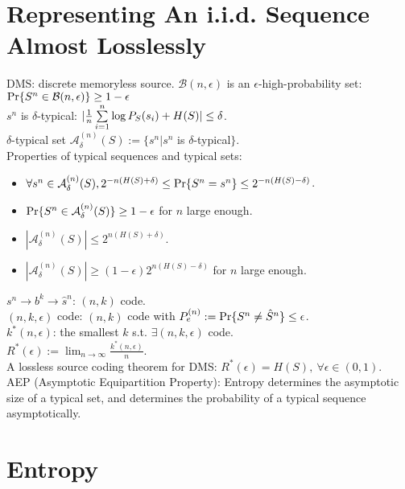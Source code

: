 \section{Representing An i.i.d. Sequence Almost Losslessly}

DMS: discrete memoryless source.
$\mathcal{B}(n, \epsilon)$ is an $\epsilon$-high-probability set: $\P\{S^n\in\mathcal{B}(n, \epsilon)\}\geq1-\epsilon$\\
$s^n$ is $\delta$-typical: $|\frac1n\suml_{i=1}^n\log P_S(s_i)+H(S)|\leq\delta$.\\
$\delta$-typical set $\mathcal{A}_\delta^{(n)}(S):=\{s^n|s^n$ is $\delta$-typical$\}$.\\
Properties of typical sequences and typical sets:
\begin{itemize}
\item $\forall s^n\in\mathcal{A}^{(n)}_\delta(S), 2^{-n(H(S)+\delta)}\leq\P\{S^n=s^n\}\leq2^{-n(H(S)-\delta)}$.
\item $\P\{S^n\in\mathcal{A}^{(n)}_\delta(S)\}\geq1-\epsilon$ for $n$ large enough.
\item $|\mathcal{A}^{(n)}_\delta(S)|\leq2^{n(H(S)+\delta)}$.
\item $|\mathcal{A}^{(n)}_\delta(S)|\geq(1-\epsilon)2^{n(H(S)-\delta)}$ for $n$ large enough.
\end{itemize}
$s^n\to b^k\to\hat s^n$: $(n, k)$ code.\\
$(n, k, \epsilon)$ code: $(n, k)$ code with $P^{(n)}_e:=\P\{S^n\neq\hat S^n\}\leq\epsilon$.\\
$k^*(n, \epsilon)$: the smallest $k$ s.t. $\exists(n, k, \epsilon)$ code.\\
$R^*(\epsilon):=\lim_{n\to\infty}\frac{k^*(n, \epsilon)}n$.\\
A	lossless source coding theorem for DMS: $R^*(\epsilon)=H(S),\ \forall\epsilon\in(0, 1)$.\\
AEP (Asymptotic Equipartition Property): Entropy determines the asymptotic size of a typical set, and determines the probability of a typical sequence asymptotically.

\section{Entropy}

